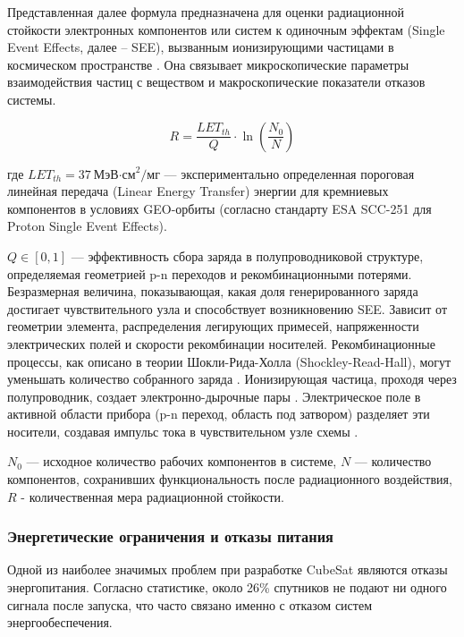 Представленная далее формула предназначена для оценки радиационной стойкости электронных компонентов или систем к одиночным эффектам (Single Event Effects, далее -- SEE), вызванным ионизирующими частицами в космическом пространстве \cite{ESASCC25100, MILSTD883, ECSS_Q_ST_60_15C}. Она связывает микроскопические параметры взаимодействия частиц с веществом и макроскопические показатели отказов системы.

\begin{equation}
	R = \frac{LET_{th}}{Q} \cdot \ln\left(\frac{N_0}{N}\right)
\end{equation}

где $LET_{th} = 37\ \text{МэВ·см}^2/\text{мг}$ — экспериментально определенная пороговая линейная передача (Linear Energy Transfer)
энергии для кремниевых компонентов в
условиях GEO-орбиты (согласно стандарту ESA SCC-251 для Proton Single Event Effects).

$Q \in [0,1]$ — эффективность сбора заряда в полупроводниковой структуре,
определяемая геометрией p-n переходов и рекомбинационными потерями. Безразмерная величина, показывающая, какая доля генерированного заряда достигает чувствительного узла и способствует возникновению SEE. Зависит от геометрии элемента, распределения легирующих примесей, напряженности электрических полей и скорости рекомбинации носителей. Рекомбинационные процессы, как описано в теории Шокли-Рида-Холла (Shockley-Read-Hall), могут уменьшать количество собранного заряда \cite{NASA_AnnealingKinetics}. Ионизирующая частица, проходя через полупроводник, создает электронно-дырочные пары \cite[Раздел III]{DTIC_GaAs_SchottkyRad}. Электрическое поле в активной области прибора (p-n переход, область под затвором) разделяет эти носители, создавая импульс тока в чувствительном узле схемы \cite[Раздел II]{DTIC_GaAs_SchottkyRad}.

$N_0$ —
исходное количество рабочих компонентов в системе, $N$ — количество компонентов,
сохранивших функциональность после радиационного воздействия, \textbf{$R$} - количественная мера радиационной стойкости.


\subsubsection{Энергетические ограничения и отказы питания}
Одной из наиболее значимых проблем при разработке CubeSat являются отказы энергопитания. Согласно статистике, около 26\% спутников не подают ни одного сигнала после запуска, что часто связано именно с отказом систем энергообеспечения\cite{kulu2020nanosats}.

